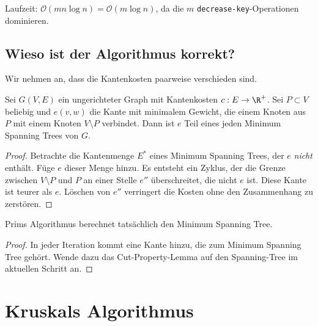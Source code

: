 \documentclass[11pt]{scrbook}
\renewcommand{\O}{\mathcal{O}}
\begin{document}
Laufzeit: $\O(mn \log n) = \O(m\log n)$, da die $m$ \texttt{decrease-key}-Operationen dominieren.

\subsection{Wieso ist der Algorithmus korrekt?}

Wir nehmen an, dass die Kantenkosten paarweise verschieden sind.

\begin{lem}
	Sei $G(V,E)$ ein ungerichteter Graph mit Kantenkosten $c:E\to \R^+$.
	Sei $P\subset V$ beliebig und $e(v,w)$ die Kante mit minimalem Gewicht, die einem Knoten aus $P$ mit einem Knoten $V\setminus P$ verbindet.
	Dann ist $e$ Teil eines jeden Minimum Spanning Trees von $G$.
	\begin{proof}
		Betrachte die Kantenmenge $E^*$ eines Minimum Spanning Trees, der $e$ \emph{nicht} enthält.
		Füge $e$ dieser Menge hinzu.
		Es entsteht ein Zyklus, der die Grenze zwischen $V\setminus P$ und $P$ an einer Stelle $e''$ überschreitet, die nicht $e$ ist.
		Diese Kante ist teurer als $e$.
		Löschen von $e''$ verringert die Kosten ohne den Zusammenhang zu zerstören.
	\end{proof}
\end{lem}

\begin{kor}
	Prims Algorithmus berechnet tatsächlich den Minimum Spanning Tree.
	\begin{proof}
		In jeder Iteration kommt eine Kante hinzu, die zum Minimum Spanning Tree gehört.
		Wende dazu das Cut-Property-Lemma auf den Spanning-Tree im aktuellen Schritt an.
	\end{proof}
\end{kor}


\section{Kruskals Algorithmus}
\end{document}
